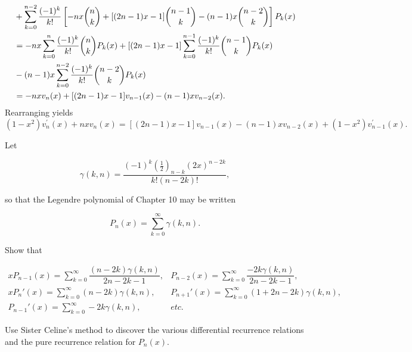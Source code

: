 \begin{solution}
\begin{align*}
 & +\sum_{k=0}^{n-2}\frac{(-1)^{k}}{k!}\left[-nx\dbinom{n}{k}+[(2n-1)x-1]\dbinom{n-1}{k}-(n-1)x\dbinom{n-2}{k}\right]P_{k}(x)\\
 & =-nx\sum_{k=0}^{n}\frac{(-1)^{k}}{k!}\dbinom{n}{k}P_{k}(x)+[(2n-1)x-1]\sum_{k=0}^{n-1}\frac{(-1)^{k}}{k!}\dbinom{n-1}{k}P_{k}(x)\\
 & -(n-1)x\sum_{k=0}^{n-2}\frac{(-1)^{k}}{k!}\dbinom{n-2}{k}P_{k}(x)\\
 & =-nxv_{n}(x)+[(2n-1)x-1]v_{n-1}(x)-(n-1)xv_{n-2}(x).
\end{align*}
Rearranging yields 
\[
(1-x^{2})v_{n}^{\prime}(x)+nxv_{n}(x)=[(2n-1)x-1]v_{n-1}(x)-(n-1)xv_{n-2}(x)+(1-x^{2})v_{n-1}^{\prime}(x).
\]
\end{solution}
\begin{problem}\label{problem9chapter14}
Let

$$\gamma(k,n)= \dfrac{(-1)^k (\frac{1}{2})_{n-k} (2x)^{n-2k}}{k! (n-2k)!},$$

so that the Legendre polynomial of Chapter 10 may be written

$$P_n(x) = \displaystyle\sum_{k=0}^{\infty} \gamma(k,n).$$

Show that

$$\begin{array}{ll}
xP_{n-1}(x)=\displaystyle\sum_{k=0}^{\infty} \dfrac{(n-2k)\gamma(k,n)}{2n-2k-1}, & P_{n-2}(x) = \displaystyle\sum_{k=0}^{\infty} \dfrac{-2k \gamma(k,n)}{2n-2k-1}, \\
xP_n'(x) = \displaystyle\sum_{k=0}^{\infty} (n-2k)\gamma(k,n), & P_{n+1}'(x) = \displaystyle\sum_{k=0}^{\infty} (1+2n-2k) \gamma(k,n), \\
P_{n-1}'(x) = \displaystyle\sum_{k=0}^{\infty} -2k\gamma(k,n), & etc.
\end{array}$$

Use Sister Celine's method to discover the various differential recurrence relations and the pure recurrence relation for $P_n(x)$.
\end{problem}
